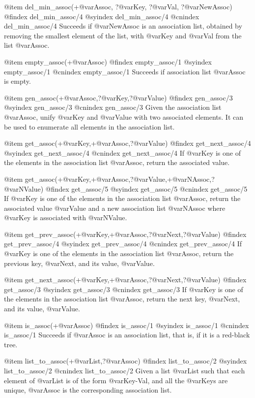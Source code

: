 @item del_min_assoc(+@var{Assoc}, ?@var{Key}, ?@var{Val}, ?@var{NewAssoc})
@findex del_min_assoc/4
@syindex del_min_assoc/4
@cnindex del_min_assoc/4
Succeeds if @var{NewAssoc} is an association list, obtained by removing
the smallest element of the list, with @var{Key} and @var{Val}
from the list @var{Assoc}.

@item empty_assoc(+@var{Assoc})
@findex empty_assoc/1
@syindex empty_assoc/1
@cnindex empty_assoc/1
Succeeds if association list @var{Assoc} is empty.

@item gen_assoc(+@var{Assoc},?@var{Key},?@var{Value})
@findex gen_assoc/3
@syindex gen_assoc/3
@cnindex gen_assoc/3
Given the association list @var{Assoc}, unify @var{Key} and @var{Value}
with two associated elements. It can be used to enumerate all elements
in the association list.

@item get_assoc(+@var{Key},+@var{Assoc},?@var{Value})
@findex get_next_assoc/4
@syindex get_next_assoc/4
@cnindex get_next_assoc/4
If @var{Key} is one of the elements in the association list @var{Assoc},
return the associated value.

@item get_assoc(+@var{Key},+@var{Assoc},?@var{Value},+@var{NAssoc},?@var{NValue})
@findex get_assoc/5
@syindex get_assoc/5
@cnindex get_assoc/5
If @var{Key} is one of the elements in the association list @var{Assoc},
return the associated value @var{Value} and a new association list
@var{NAssoc} where @var{Key} is associated with @var{NValue}.

@item get_prev_assoc(+@var{Key},+@var{Assoc},?@var{Next},?@var{Value})
@findex get_prev_assoc/4
@syindex get_prev_assoc/4
@cnindex get_prev_assoc/4
If @var{Key} is one of the elements in the association list @var{Assoc},
return the previous key, @var{Next}, and its value, @var{Value}.

@item get_next_assoc(+@var{Key},+@var{Assoc},?@var{Next},?@var{Value})
@findex get_assoc/3
@syindex get_assoc/3
@cnindex get_assoc/3
If @var{Key} is one of the elements in the association list @var{Assoc},
return the next key, @var{Next}, and its value, @var{Value}.

@item is_assoc(+@var{Assoc})
@findex is_assoc/1
@syindex is_assoc/1
@cnindex is_assoc/1
Succeeds if @var{Assoc} is an association list, that is, if it is a
red-black tree.

@item list_to_assoc(+@var{List},?@var{Assoc})
@findex list_to_assoc/2
@syindex list_to_assoc/2
@cnindex list_to_assoc/2
Given a list @var{List} such that each element of @var{List} is of the
form @var{Key-Val}, and all the @var{Keys} are unique, @var{Assoc} is
the corresponding association list.

